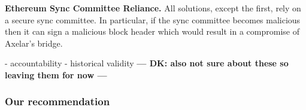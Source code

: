 \noindent\textbf{Ethereum Sync Committee Reliance.}
All solutions, except the first, rely on a secure sync committee. In
particular, if the sync committee becomes malicious then it can sign a
malicious block header which would result in a compromise of Axelar's bridge.

- accountability
- historical validity
\textbf{--- DK: also not sure about these so leaving them for now ---}

\subsubsection{Our recommendation}
